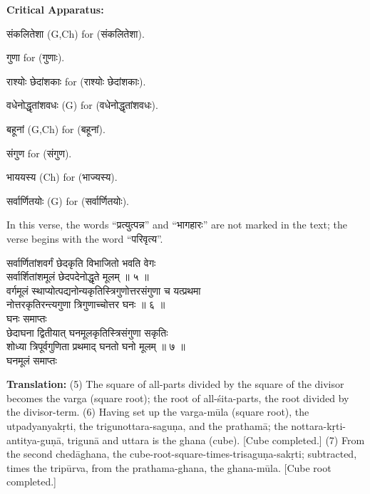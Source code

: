 \documentclass[11pt,a4paper]{article}
\newcommand{\dev}[1]{{\devanagarifont #1}}
\newcommand{\devbf}[1]{{\devanagarifontbf #1}}
\newcommand{\sanskritcol}[1]{%
  \begin{minipage}[t]{0.47\textwidth}
  \vspace{0pt}
  \begin{flushleft}
  #1
  \end{flushleft}
  \end{minipage}%
  \hfill
}
\newcommand{\englishcol}[1]{%
  \begin{minipage}[t]{0.47\textwidth}
  \vspace{0pt}
  \begin{flushleft}
  #1
  \end{flushleft}
  \end{minipage}%
}
\newenvironment{variants}{%
  \small%
  \color{varecolor}%
  \list{}{\leftmargin=2em\itemindent=-1em}%
}{\endlist}
\begin{document}
\vspace{0.4cm}
\textcolor{varecolor}{\textbf{Critical Apparatus:}}
\begin{variants}
\item[2.1] \dev{संकलितेशा} (G,Ch) \dev{for} (\dev{संकलितेशा}).
\item[2.2] \dev{गुणा} \dev{for} (\dev{गुणाः}).
\item[2.3] \dev{राश्योः छेदांशकाः} \dev{for} (\dev{राश्योः छेदांशकाः}).
\item[3.1] \dev{वधेनोद्धृतांशवधः} (G) \dev{for} (\dev{वधेनोद्धृतांशवधः}).
\item[3.2] \dev{बहूनां} (G,Ch) \dev{for} (\dev{बहूनां}).
\item[4.1] \dev{संगुण} \dev{for} (\dev{संगुण}).
\item[4.2] \dev{भाययस्य} (Ch) \dev{for} (\dev{भाज्यस्य}).
\item[4.3] \dev{सर्वार्णितयोः} (G) \dev{for} (\dev{सर्वार्णितयोः}).
\item[\dev{वि०}] In this verse, the words ``\dev{प्रत्युत्पन्न}'' and ``\dev{भागहारः}''
are not marked in the text; the verse begins with the word ``\dev{परिवृत्य}''.
\end{variants}

\noindent
\sanskritcol{\dev{सर्वार्णितांशवर्गं छेदकृति विभाजितो भवति वेगः} \\ \dev{सर्वार्शितांशमूलं छेदपदेनोद्धृते मूलम् ॥ ५ ॥} \\[0.2cm]
\dev{वर्गमूलं स्थाप्योत्पद्यनोन्यकृतिस्त्रिगुणोत्तरसंगुणा च यत्प्रथमा} \\ \dev{नोत्तरकृतिरन्त्यगुणा त्रिगुणाच्चोत्तर घनः ॥ ६ ॥} \\[0.1cm]
\devbf{घनः समाप्तः} \\[0.1cm]
\dev{छेदाघना द्वितीयात् घनमूलकृतिस्त्रिसंगुणा सकृतिः} \\ \dev{शोध्या त्रिपूर्वगुणिता प्रथमाद् घनतो घनो मूलम् ॥ ७ ॥} \\[0.1cm]
\devbf{घनमूलं समाप्तः}}
\englishcol{\textbf{Translation:} (5) The square of all-parts divided by the square of the
divisor becomes the varga (square root); the root of all-śita-parts, the root
divided by the divisor-term. (6) Having set up the varga-mūla (square root), the utpadyanyakṛti,
the trigunottara-saguṇa, and the prathamā; the nottara-kṛti-antitya-guṇā, trigunā
and uttara is the ghana (cube). [Cube completed.] (7) From the second chedāghana,
the cube-root-square-times-trisaguṇa-sakṛti; subtracted, times the tripūrva,
from the prathama-ghana, the ghana-mūla. [Cube root completed.]}
\end{document}
